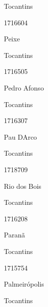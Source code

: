 \documentclass[
  letterpaper,
]{report}
\begin{document}
\n    

\n      

Tocantins

\n      

1716604

\n      

Peixe

\n    

\n    

\n      

Tocantins

\n      

1716505

\n      

Pedro Afonso

\n    

\n    

\n      

Tocantins

\n      

1716307

\n      

Pau D\textquotesingle Arco

\n    

\n    

\n      

Tocantins

\n      

1718709

\n      

Rio dos Bois

\n    

\n    

\n      

Tocantins

\n      

1716208

\n      

Paranã

\n    

\n    

\n      

Tocantins

\n      

1715754

\n      

Palmeirópolis

\n    

\n    

\n      

Tocantins

\n      
\end{document}
